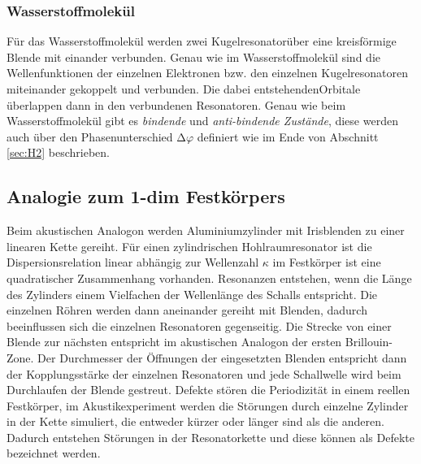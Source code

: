 \subsubsection{Wasserstoffmolekül}
\label{sec:ana-H2}

Für das Wasserstoffmolekül werden zwei Kugelresonatorüber eine kreisförmige Blende mit einander verbunden. Genau wie im Wasserstoffmolekül sind die Wellenfunktionen der einzelnen Elektronen bzw. den einzelnen Kugelresonatoren miteinander gekoppelt und verbunden. Die dabei entstehendenOrbitale überlappen dann in den verbundenen Resonatoren. Genau wie beim Wasserstoffmolekül gibt es \textit{bindende} und \textit{anti-bindende Zustände}, diese werden auch über den Phasenunterschied $\increment \varphi$ definiert wie im Ende von Abschnitt \ref{sec:H2} beschrieben.

\subsection{Analogie zum 1-dim Festkörpers}
\label{ana-fest}

Beim akustischen Analogon werden Aluminiumzylinder mit Irisblenden zu einer linearen Kette gereiht. Für einen zylindrischen Hohlraumresonator ist die Dispersionsrelation linear abhängig zur Wellenzahl $\kappa$ im Festkörper ist eine quadratischer Zusammenhang vorhanden. Resonanzen entstehen, wenn die Länge des Zylinders einem Vielfachen der Wellenlänge des Schalls entspricht. Die einzelnen Röhren werden dann aneinander gereiht mit Blenden, dadurch beeinflussen sich die einzelnen Resonatoren gegenseitig. Die Strecke von einer Blende zur nächsten entspricht im akustischen Analogon der ersten Brillouin-Zone. Der Durchmesser der Öffnungen der eingesetzten Blenden entspricht dann der Kopplungsstärke der einzelnen Resonatoren und jede Schallwelle wird beim Durchlaufen der Blende gestreut. Defekte stören die Periodizität in einem reellen Festkörper, im Akustikexperiment werden die Störungen durch einzelne Zylinder in der Kette simuliert, die entweder kürzer oder länger sind als die anderen. Dadurch entstehen Störungen in der Resonatorkette und diese können als Defekte bezeichnet werden.
